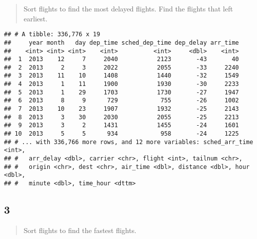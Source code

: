 \documentclass[]{article}
\newenvironment{Shaded}{\begin{snugshade}}{\end{snugshade}}
\newcommand{\KeywordTok}[1]{\textcolor[rgb]{0.13,0.29,0.53}{\textbf{#1}}}
\newcommand{\NormalTok}[1]{#1}
\newcommand{\OperatorTok}[1]{\textcolor[rgb]{0.81,0.36,0.00}{\textbf{#1}}}
\newcommand{\StringTok}[1]{\textcolor[rgb]{0.31,0.60,0.02}{#1}}
\begin{document}
\begin{quote}
Sort flights to find the most delayed flights. Find the flights that
left earliest.
\end{quote}

\begin{Shaded}
\end{Shaded}

\begin{verbatim}
## # A tibble: 336,776 x 19
##     year month   day dep_time sched_dep_time dep_delay arr_time
##    <int> <int> <int>    <int>          <int>     <dbl>    <int>
##  1  2013    12     7     2040           2123       -43       40
##  2  2013     2     3     2022           2055       -33     2240
##  3  2013    11    10     1408           1440       -32     1549
##  4  2013     1    11     1900           1930       -30     2233
##  5  2013     1    29     1703           1730       -27     1947
##  6  2013     8     9      729            755       -26     1002
##  7  2013    10    23     1907           1932       -25     2143
##  8  2013     3    30     2030           2055       -25     2213
##  9  2013     3     2     1431           1455       -24     1601
## 10  2013     5     5      934            958       -24     1225
## # ... with 336,766 more rows, and 12 more variables: sched_arr_time <int>,
## #   arr_delay <dbl>, carrier <chr>, flight <int>, tailnum <chr>,
## #   origin <chr>, dest <chr>, air_time <dbl>, distance <dbl>, hour <dbl>,
## #   minute <dbl>, time_hour <dttm>
\end{verbatim}

\hypertarget{section-2}{%
\subsection{3}\label{section-2}}

\begin{quote}
Sort flights to find the fastest flights.
\end{quote}

\begin{Shaded}
\end{Shaded}
\end{document}
